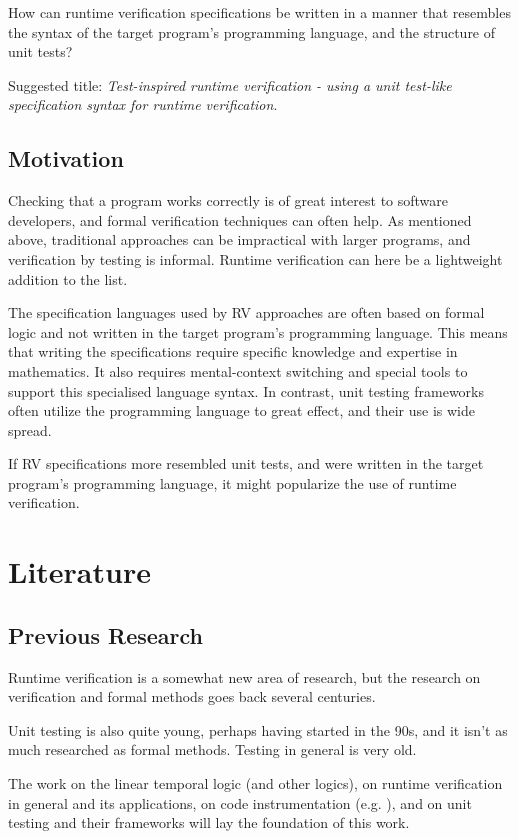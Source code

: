 \documentclass[a4paper,11pt]{article}
\begin{document}
How can runtime verification specifications be written in a manner that resembles the syntax of
the target program's programming language, and the structure of unit tests?

Suggested title: \textit{Test-inspired runtime verification - using a unit test-like specification syntax for runtime verification}.


\subsection{Motivation}

Checking that a program works correctly is of great interest to software developers, and
formal verification techniques can often help. As mentioned above, traditional approaches
can be impractical with larger programs, and verification by testing is informal.
Runtime verification can here be a lightweight addition to the list.

The specification languages used by RV approaches are often based
on formal logic and not written in the target program's programming language. 
This means that writing the specifications require specific knowledge and expertise in mathematics. 
It also requires mental-context switching and special tools
to support this specialised language syntax. In contrast, unit testing frameworks often
utilize the programming language to great effect, and their use is wide spread.

If RV specifications more resembled unit tests, and were written in the target program's
programming language, it might popularize the use of runtime verification.


\section{Literature}

\subsection{Previous Research}

Runtime verification is a somewhat new area of research, but the research on verification and formal methods goes back several centuries.

Unit testing is also quite young, perhaps having started in the 90s, and it isn't as much researched as formal methods. Testing in general is very old.

The work on the linear temporal logic (and other logics), on runtime verification in general and its applications, on code instrumentation (e.g. \cite{aspectj,matusiak09}), and on unit testing and their frameworks will lay the foundation of this work.
\end{document}
